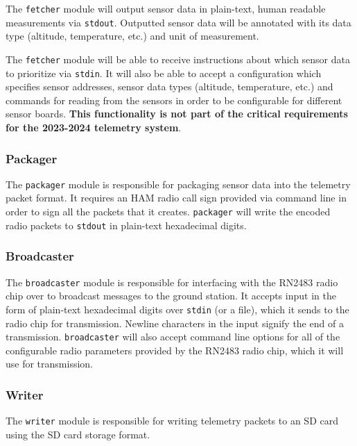 The \texttt{fetcher} module will output sensor data in plain-text, human readable measurements via
\texttt{\gls{stdout}}. Outputted sensor data will be annotated with its data type (altitude, temperature, etc.) and
unit of measurement.

The \texttt{fetcher} module will be able to receive instructions about which sensor data to prioritize via
\texttt{\gls{stdin}}. It will also be able to accept a configuration which specifies sensor addresses, sensor data
types (altitude, temperature, etc.) and commands for reading from the sensors in order to be configurable for different
 sensor boards. \textbf{This functionality is not part of the critical requirements for the 2023-2024
    telemetry system}.

\subsubsection{Packager}

The \texttt{packager} module is responsible for packaging sensor data into the  telemetry packet
format. It requires an HAM radio call sign provided via command line in order to sign all the packets that it creates.
\texttt{packager} will write the encoded radio packets to \texttt{\gls{stdout}} in plain-text hexadecimal digits.

\subsubsection{Broadcaster}

The \texttt{broadcaster} module is responsible for interfacing with the  RN2483 radio chip over
 to broadcast messages to the ground station. It accepts input in the form of plain-text hexadecimal
digits over \texttt{\gls{stdin}} (or a file), which it sends to the radio chip for transmission. Newline characters in
the input signify the end of a transmission. \texttt{broadcaster} will also accept command line options for all of the
configurable radio parameters provided by the RN2483 radio chip, which it will use for transmission.

\subsubsection{Writer}

The \texttt{writer} module is responsible for writing  telemetry packets to an SD card using the
 SD card storage format.

